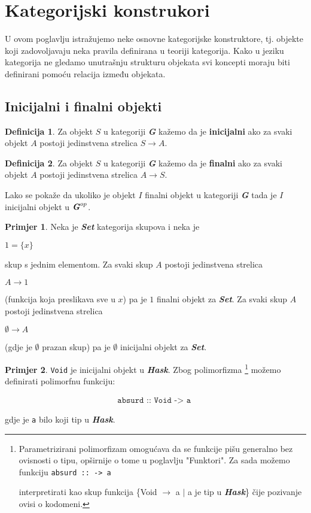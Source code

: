 \documentclass[11pt]{article}
\newcommand{\category}[1]{\textbf{\emph{#1}}}
\newcommand{\codei}[1]{
  {\lstinline[basicstyle=\ttfamily]{#1}}
}
\newcommand{\code}[1]{
  \begin{align*}
    \texttt{#1}
  \end{align*}
  }
\theoremstyle{definition}
\newtheorem{definition}{Definicija}
\newtheorem{primjer}{Primjer}
\begin{document}
  \section{Kategorijski konstrukori}
  U ovom poglavlju istražujemo neke osnovne kategorijske
  konstruktore, tj. objekte koji zadovoljavaju neka pravila definirana u teoriji
  kategorija. Kako u jeziku kategorija ne gledamo unutrašnju strukturu objekata
  svi koncepti moraju biti definirani pomoću relacija između objekata.
  \subsection{Inicijalni i finalni objekti}
  \begin{definition}
    Za objekt $S$ u kategoriji \category{G} kažemo da je \textbf{inicijalni} ako za svaki
    objekt $A$ postoji jedinstvena strelica $S \xrightarrow{} A$.
  \end{definition}
  \begin{definition}
    Za objekt $S$ u kategoriji \category{G} kažemo da je \textbf{finalni} ako za svaki
    objekt $A$ postoji jedinstvena strelica $A \xrightarrow{} S$.
  \end{definition}
  Lako se pokaže da ukoliko je objekt $I$ finalni objekt u kategoriji \category{G} tada je $I$ inicijalni objekt u $\category{G}^{op}$.
  \begin{primjer}
    Neka je \category{Set} kategorija skupova i neka je 
    \begin{center}
      $1 = \{x\}$
    \end{center}
    skup s jednim elementom. Za svaki skup $A$ postoji jedinstvena strelica
    \begin{center}
      $A \xrightarrow{} 1$
    \end{center}
    (funkcija koja preslikava sve u $x$) pa je $1$ finalni objekt za
    \category{Set}.
    Za svaki skup $A$ postoji jedinstvena strelica
    \begin{center}
      $\emptyset \xrightarrow{} A$
    \end{center}
    (gdje je $\emptyset$ prazan skup) pa je $\emptyset$ inicijalni objekt za
    \category{Set}.
  \end{primjer}
  \begin{primjer} \codei{Void} je inicijalni objekt u \category{Hask}.
    Zbog polimorfizma \footnote{Parametrizirani polimorfizam omogućava da se
      funkcije pišu generalno bez ovisnosti o tipu, opširnije o tome u
      poglavlju "Funktori". Za sada možemo funkciju \codei{absurd :: -> a}
      interpretirati kao skup funkcija \{Void $\to$ a $|$ a je tip u
      \category{Hask}\} čije pozivanje ovisi o kodomeni.} možemo definirati polimorfnu funkciju:
    \code{
      absurd :: Void -> a
    }
    gdje je \codei{a} bilo koji tip u \category{Hask}.
  \end{primjer}
\end{document}
